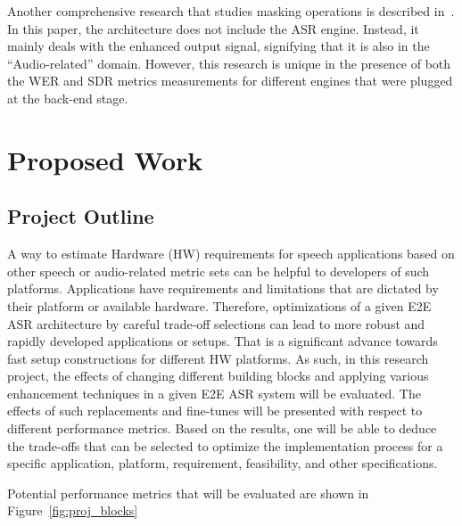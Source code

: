 Another comprehensive research 
that studies masking operations
is described in~\cite{8466865}.
In this paper, the architecture does not include
the ASR engine. 
Instead, it mainly deals with the enhanced output signal,
signifying that it is also in the ``Audio-related'' domain.
However, this research is unique in the presence of both the WER and SDR metrics measurements
for different engines that were plugged at the back-end stage.




\section{Proposed Work}

\subsection{Project Outline}
A way to estimate Hardware (HW) requirements for speech
applications
based on other speech or audio-related metric sets
can be helpful to developers of such platforms.
Applications have requirements and limitations
that are dictated by their platform or available hardware.
Therefore, optimizations of a given E2E ASR architecture by careful
trade-off selections can lead to more robust and rapidly
developed applications or setups.
That is a significant advance towards fast setup constructions for different HW platforms.
As such, in this research project, the effects of changing different
building blocks and applying various enhancement techniques
in a given E2E ASR system will be evaluated.
The effects of such replacements and
fine-tunes will be presented with respect to different
performance metrics. Based on the results, one will be able to deduce the trade-offs
that can be selected to optimize the implementation process for a specific
application, platform, requirement, feasibility, and other specifications.

\bigskip

Potential performance metrics that will be evaluated
are shown in Figure~\ref{fig:proj_blocks}

